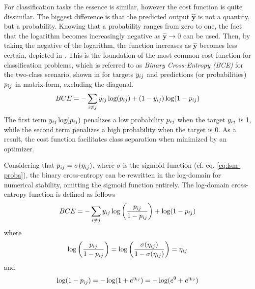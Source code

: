         For classification tasks the essence is similar, however the cost function is quite dissimilar. The biggest difference is that the predicted output $\bm{\hat{y}}$ is not a quantity, but a probability. Knowing that a probability ranges from zero to one, the fact that the logarithm becomes increasingly negative as $\bm{\hat{y}}\rightarrow0$ can be used. Then, by taking the negative of the logarithm, the function increases as $\bm{\hat{y}}$ becomes less certain, depicted in .
        This is the foundation of the most common cost function for classification problems, which is referred to as \emph{Binary Cross-Entropy (BCE)} for the two-class scenario, shown in  for targets $\sub(y)$ and predictions (or probabilities) $\sub(p)$ in matrix-form, excluding the diagonal.
        \begin{equation}\label{eq:mopt-bceloss}
            BCE = -\sum_{i\neq j} \sub(y)\log(\sub(p))+(1-\sub(y))\log(1-\sub(p))
        \end{equation}
        The first term $\sub(y)\log(\sub(p))$ penalizes a low probability $\sub(p)$ when the target $\sub(y)$ is 1, while the second term penalizes a high probability when the target is 0. As a result, the cost function facilitates class separation when minimized by an optimizer.
        
        Considering that $\sub(p)=\sigma(\sub(\eta))$, where $\sigma$ is the sigmoid function (cf. eq. \ref{eq:lsm-proba}), the binary cross-entropy can be rewritten in the log-domain for numerical stability, omitting the sigmoid function entirely. The log-domain cross-entropy function is defined as follows
        \begin{equation}\label{eq:bce-log-domain}
            BCE = -\sum_{i\neq j} \sub(y)\log\left(\frac{\sub(p)}{1-\sub(p)}\right) + \log(1-\sub(p))
        \end{equation}
        where %
        \begin{equation}\label{eq:bce-rewrite-first}
            \log\left(\frac{\sub(p)}{1-\sub(p)}\right) =
            \log\left(\frac{\sigma(\sub(\eta))}{1-\sigma(\sub(\eta))}\right) = \sub(\eta)
        \end{equation}
        and %
        \begin{equation}\label{eq:bce-rewrite-second}
            \log(1-\sub(p))=-\log(1+e^{\sub(\eta)})=-\log(e^0+e^{\sub(\eta)})
        \end{equation}
        
